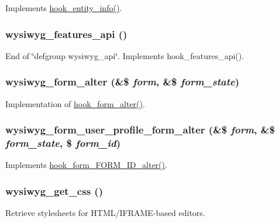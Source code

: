 Implements \hyperlink{group__hooks_gaf02318e9d0e8cdbf6d187b271b9969a8}{hook\_\-entity\_\-info()}. \hypertarget{wysiwyg_8module_a50b7a796362c1595678743fc3d4307d7}{
\subsubsection[{wysiwyg\_\-features\_\-api}]{\setlength{\rightskip}{0pt plus 5cm}wysiwyg\_\-features\_\-api ()}}
\label{wysiwyg_8module_a50b7a796362c1595678743fc3d4307d7}
End of \char`\"{}defgroup wysiwyg\_\-api\char`\"{}. Implements hook\_\-features\_\-api(). \hypertarget{wysiwyg_8module_a452faad91d7d0855861a5a36739013a7}{
\subsubsection[{wysiwyg\_\-form\_\-alter}]{\setlength{\rightskip}{0pt plus 5cm}wysiwyg\_\-form\_\-alter (\&\$ {\em form}, \/  \&\$ {\em form\_\-state})}}
\label{wysiwyg_8module_a452faad91d7d0855861a5a36739013a7}
Implementation of \hyperlink{group__hooks_ga6df3cea27ae1407aeef4eae5444cb213}{hook\_\-form\_\-alter()}. \hypertarget{wysiwyg_8module_a39cf10beffe3a191736440a4787e89c0}{
\subsubsection[{wysiwyg\_\-form\_\-user\_\-profile\_\-form\_\-alter}]{\setlength{\rightskip}{0pt plus 5cm}wysiwyg\_\-form\_\-user\_\-profile\_\-form\_\-alter (\&\$ {\em form}, \/  \&\$ {\em form\_\-state}, \/  \$ {\em form\_\-id})}}
\label{wysiwyg_8module_a39cf10beffe3a191736440a4787e89c0}
Implements \hyperlink{group__hooks_ga8d4a4089551493d55911bd5c4f218264}{hook\_\-form\_\-FORM\_\-ID\_\-alter()}. \hypertarget{wysiwyg_8module_a372ab7c51cdabba4b7bf9b01d5522136}{
\subsubsection[{wysiwyg\_\-get\_\-css}]{\setlength{\rightskip}{0pt plus 5cm}wysiwyg\_\-get\_\-css ()}}
\label{wysiwyg_8module_a372ab7c51cdabba4b7bf9b01d5522136}
Retrieve stylesheets for HTML/IFRAME-\/based editors.


